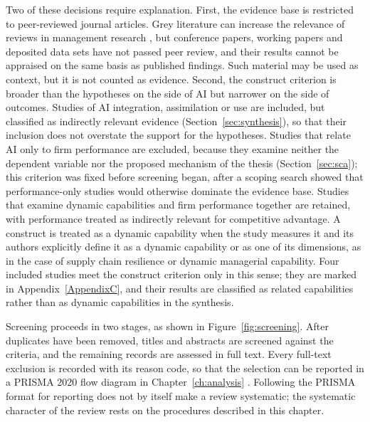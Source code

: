 Two of these decisions require explanation. First, the evidence base is restricted to peer-reviewed journal articles. Grey literature can increase the relevance of reviews in management research \parencite{adams2017}, but conference papers, working papers and deposited data sets have not passed peer review, and their results cannot be appraised on the same basis as published findings. Such material may be used as context, but it is not counted as evidence. Second, the construct criterion is broader than the hypotheses on the side of AI but narrower on the side of outcomes. Studies of AI integration, assimilation or use are included, but classified as indirectly relevant evidence (Section~\ref{sec:synthesis}), so that their inclusion does not overstate the support for the hypotheses. Studies that relate AI only to firm performance are excluded, because they examine neither the dependent variable nor the proposed mechanism of the thesis (Section~\ref{sec:sca}); this criterion was fixed before screening began, after a scoping search showed that performance-only studies would otherwise dominate the evidence base. Studies that examine dynamic capabilities and firm performance together are retained, with performance treated as indirectly relevant for competitive advantage. A construct is treated as a dynamic capability when the study measures it and its authors explicitly define it as a dynamic capability or as one of its dimensions, as in the case of supply chain resilience or dynamic managerial capability. Four included studies meet the construct criterion only in this sense; they are marked in Appendix~\ref{AppendixC}, and their results are classified as related capabilities rather than as dynamic capabilities in the synthesis.

Screening proceeds in two stages, as shown in Figure~\ref{fig:screening}. After duplicates have been removed, titles and abstracts are screened against the criteria, and the remaining records are assessed in full text. Every full-text exclusion is recorded with its reason code, so that the selection can be reported in a PRISMA 2020 flow diagram in Chapter~\ref{ch:analysis} \parencite{page2021}. Following the PRISMA format for reporting does not by itself make a review systematic; the systematic character of the review rests on the procedures described in this chapter.

